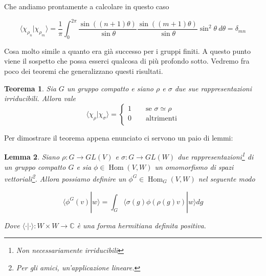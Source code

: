 \documentclass[11pt]{article}
\theoremstyle{plain}
\newtheorem{thm}{Teorema}[section]
\newtheorem{lemma}[thm]{Lemma}
\theoremstyle{definition}
\theoremstyle{remark}
\newcommand{\C}{\mathbb{C}}
\newcommand{\dint}{\displaystyle\int}
\DeclareMathOperator{\Hom}{Hom}
\DeclareMathOperator{\iso}{\simeq}
\begin{document}
 Che andiamo prontamente a calcolare in questo caso

 \[
 \langle \chi_{\rho_n} | \chi_{\rho_m} \rangle = \dfrac{1}{\pi}\dint_0^{2\pi} \dfrac{\sin((n+1)\theta)}{\sin\theta} \dfrac{\sin((m+1)\theta)}{\sin\theta} \sin^2\theta \ d\theta = \delta_{mn}
 \]


 Cosa molto simile a quanto era già successo per i gruppi finiti. A questo punto viene il sospetto che possa esserci qualcosa di più profondo sotto. Vedremo fra poco dei teoremi che generalizzano questi risultati.








 \begin{thm}
   \label{thm:ortogonalita compatto}
   Sia $G$ un gruppo compatto  e siano $\rho$ e $\sigma$ due sue rappresentazioni irriducibili. Allora vale
   \[
   \langle \chi_\rho | \chi_\sigma \rangle =
   \begin{cases}
     1 \qquad \text{se } \sigma \iso \rho \\
     0 \qquad \text{altrimenti} \\
   \end{cases}
   \]
 \end{thm}

 Per dimostrare il teorema appena enunciato ci servono un paio di lemmi:

 \begin{lemma}
   Siano $\rho: G \to GL(V)$ e $\sigma: G \to GL(W)$ due rappresentazioni\footnote{Non necessariamente irriducibili} di un gruppo compatto $G$ e sia $\phi \in \Hom(V, W)$ un omomorfismo di spazi vettoriali\footnote{Per gli amici, un'applicazione lineare.}. Allora possiamo definire un $\phi^G \in \Hom_G(V, W) $ nel seguente modo

   \[ \langle \phi^G(v) | w \rangle = \dint_G \langle \sigma(g) \phi (\rho(g) v) | w\rangle dg\]

   Dove $\langle \cdot | \cdot \rangle : W \times W \to \C$ è una forma hermitiana definita positiva.

 \end{lemma}
\end{document}
